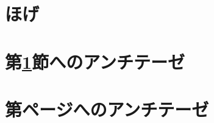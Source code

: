 \documentclass{jarticle}
\begin{document}
\tableofcontents
\section{ほげ}\label{sec:hoge}
\section{第\ref{sec:hoge}節へのアンチテーゼ}
\section{第\pageref{sec:hoge}ページへのアンチテーゼ}
\end{document}

